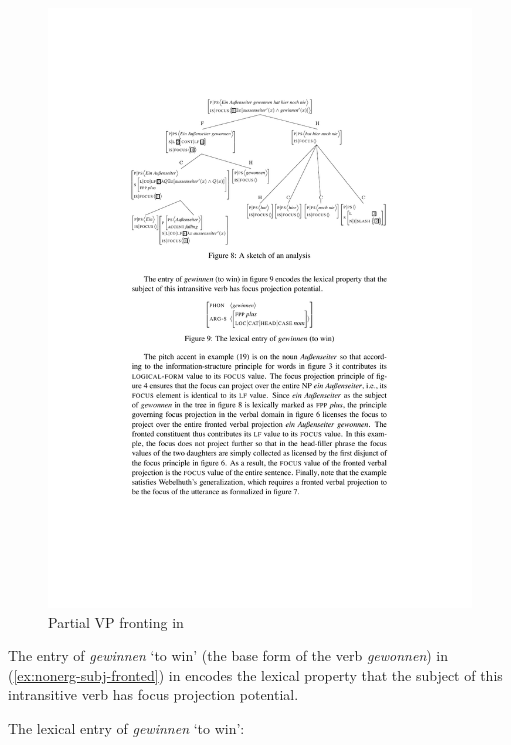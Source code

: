 \documentclass[output=paper
                ,modfonts
                ,nonflat
	        ,collection
	        ,collectionchapter
	        ,collectiontoclongg
 	        ,biblatex
                ,babelshorthands
                ,newtxmath
                ,draftmode
                ,colorlinks, citecolor=brown
]{./langsci/langscibook}
\begin{document}
  \begin{figure}
    \centering
    \includegraphics[scale=0.9]{figures/vp-focus-exponent}
    \caption{Partial VP fronting in \cite{dKM2003a}}
    \label{fig:focus-exponent}
  \end{figure}
  The entry of \textit{gewinnen} `to win' (the base form of the verb
  \textit{gewonnen}) in (\ref{ex:nonerg-subj-fronted}) in
   encodes the lexical property that the
  subject of this intransitive verb has focus projection potential.

\ea
\label{fig:lex-entry}
The lexical entry of \textit{gewinnen} `to win':\\
%
  \begin{avm}
  \end{avm}
\z
\end{document}
